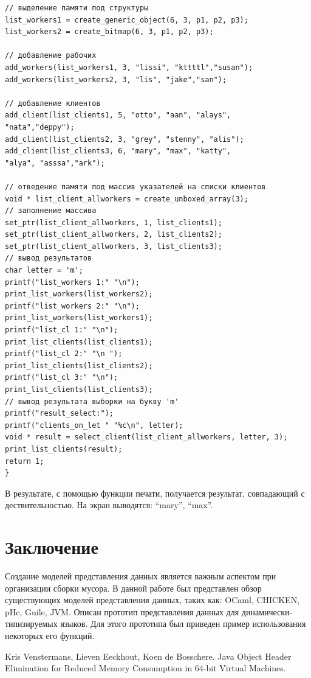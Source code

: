 \begin{verbatim}
// выделение памяти под структуры
list_workers1 = create_generic_object(6, 3, p1, p2, p3);
list_workers2 = create_bitmap(6, 3, p1, p2, p3);

// добавление рабочих
add_workers(list_workers1, 3, "lissi", "kttttl","susan");
add_workers(list_workers2, 3, "lis", "jake","san");

// добавление клиентов
add_client(list_clients1, 5, "otto", "aan", "alays",
"nata","deppy");
add_client(list_clients2, 3, "grey", "stenny", "alis");
add_client(list_clients3, 6, "mary", "max", "katty",
"alya", "asssa","ark");

// отведение памяти под массив указателей на списки клиентов
void * list_client_allworkers = create_unboxed_array(3);
// заполнение массива
set_ptr(list_client_allworkers, 1, list_clients1);
set_ptr(list_client_allworkers, 2, list_clients2);
set_ptr(list_client_allworkers, 3, list_clients3);
// вывод результатов
char letter = 'm';
printf("list_workers 1:" "\n");
print_list_workers(list_workers2);
printf("list_workers 2:" "\n");
print_list_workers(list_workers1);
printf("list_cl 1:" "\n");
print_list_clients(list_clients1);
printf("list_cl 2:" "\n ");
print_list_clients(list_clients2);
printf("list_cl 3:" "\n");
print_list_clients(list_clients3);
// вывод результата выборки на букву 'm'
printf("result_select:");
printf("clients_on_let " "%c\n", letter);
void * result = select_client(list_client_allworkers, letter, 3);
print_list_clients(result);
return 1;
}
\end{verbatim}

В результате, с помощью функции печати, получается результат, совпадающий с дествительностью. На экран выводятся: ``mary'', ``max''.


\section*{Заключение}

Создание моделей представления данных является важным аспектом при организации сборки мусора. В данной работе был представлен
обзор существующих моделей представления данных, таких как: OCaml, CHICKEN, pHc, Guile, JVM. Описан прототип представления данных для динамически-типизируемых
языков. Для этого прототипа был приведен пример использования некоторых его функций.

\begin{thebibliography}{99}
Kris Venstermans, Lieven Eeckhout, Koen de Bosschere.
Java Object Header Elimination for Reduced Memory Consumption in 64-bit Virtual Machines.
\end{thebibliography}
